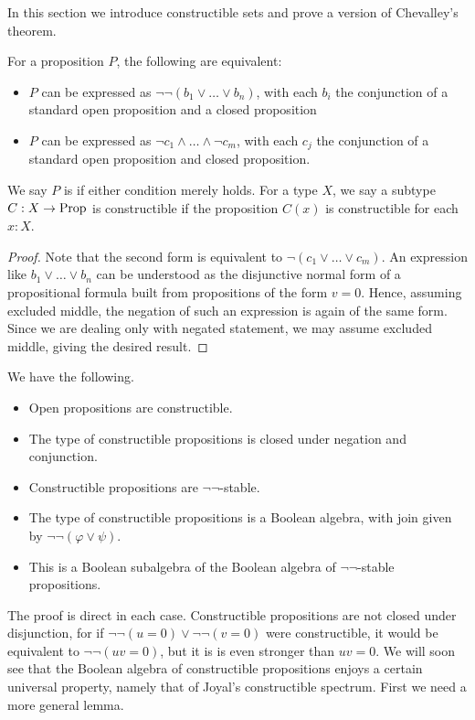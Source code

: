 In this section we introduce constructible sets and prove a version of Chevalley's theorem.

\begin{lemma}
  For a proposition $P$, the following are equivalent:
  \begin{itemize}
  \item $P$ can be expressed as $\neg \neg (b_1 \vee \ldots \vee b_n)$, with each $b_i$ 
    the conjunction of a standard open proposition and a closed proposition
  \item $P$ can be expressed as $\neg c_1 \wedge \ldots \wedge \neg c_m$, with each $c_j$
    the conjunction of a standard open proposition and closed proposition.
  \end{itemize}
  We say $P$ is  if either condition merely holds.
  For a type $X$, we say a subtype $C : X \to \mathrm{Prop}$ is constructible if the proposition
  $C(x)$ is constructible for each $x : X$.
\end{lemma}
\begin{proof}
  Note that the second form is equivalent to $\neg (c_1 \vee \ldots \vee c_m)$.
  An expression like $b_1 \vee \ldots \vee b_n$ can be understood as the disjunctive
  normal form of a propositional formula built from propositions of the form $v = 0$.
  Hence, assuming excluded middle, the negation of such an expression is again of the
  same form. Since we are dealing only with negated statement, we may assume
  excluded middle, giving the desired result.
\end{proof}

\begin{lemma} We have the following.
    \begin{itemize}
    \item Open propositions are constructible. 
    \item The type of constructible propositions is closed under negation and conjunction. 
    \item Constructible propositions are $\neg \neg$-stable.
    \item The type of constructible propositions is a Boolean algebra, with join given by $\neg \neg (\varphi \vee \psi)$.
    \item This is a Boolean subalgebra of the Boolean algebra of $\neg \neg$-stable propositions.
    \end{itemize}
\end{lemma}

The proof is direct in each case. Constructible propositions are not closed under disjunction, 
for if $\neg \neg (u = 0) \vee \neg \neg (v = 0)$ were constructible, it would be equivalent to
$\neg \neg (uv = 0)$, but it is is even stronger than $uv = 0$.
We will soon see that the Boolean algebra of constructible propositions enjoys a certain universal
property, namely that of Joyal's constructible spectrum. First we need a more general lemma.

